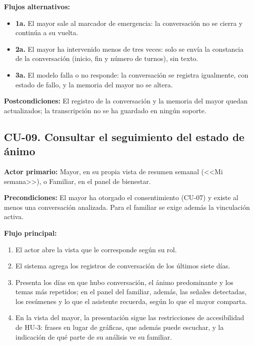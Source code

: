 \noindent\textbf{Flujos alternativos:}
\begin{itemize}[nosep]
    \item \textbf{1a.} El mayor sale al marcador de emergencia: la conversación no se cierra y continúa a su vuelta.
    \item \textbf{2a.} El mayor ha intervenido menos de tres veces: solo se envía la constancia de la conversación (inicio, fin y número de turnos), sin texto.
    \item \textbf{3a.} El modelo falla o no responde: la conversación se registra igualmente, con estado de fallo, y la memoria del mayor no se altera.
\end{itemize}

\noindent\textbf{Postcondiciones:} El registro de la conversación y la memoria del mayor quedan actualizados; la transcripción no se ha guardado en ningún soporte.

\bigskip

\subsection*{CU-09. Consultar el seguimiento del estado de ánimo}

\noindent\textbf{Actor primario:} Mayor, en su propia vista de resumen semanal (<<Mi semana>>), o Familiar, en el panel de bienestar.

\noindent\textbf{Precondiciones:} El mayor ha otorgado el consentimiento (CU-07) y existe al menos una conversación analizada. Para el familiar se exige además la vinculación activa.

\noindent\textbf{Flujo principal:}
\begin{enumerate}[nosep]
    \item El actor abre la vista que le corresponde según su rol.
    \item El sistema agrega los registros de conversación de los últimos siete días.
    \item Presenta los días en que hubo conversación, el ánimo predominante y los temas más repetidos; en el panel del familiar, además, las señales detectadas, los resúmenes y lo que el asistente recuerda, según lo que el mayor comparta.
    \item En la vista del mayor, la presentación sigue las restricciones de accesibilidad de HU-3: frases en lugar de gráficas, que además puede escuchar, y la indicación de qué parte de su análisis ve su familiar.
\end{enumerate}


